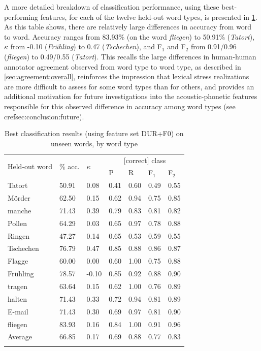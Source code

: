 	
	A more detailed breakdown of classification performance, using these best-performing features, for each of the twelve held-out word types, is presented in \cref{tab:results:wordtypes}. As this table shows, there are relatively large differences in accuracy from word to word. Accuracy ranges from 83.93\% (on the word \textit{fliegen}) to 50.91\% (\textit{Tatort}), $\kappa$ from -0.10 (\textit{Fr\"uhling}) to 0.47 (\textit{Tschechen}), and F$_1$ and F$_2$ from 0.91/0.96 (\textit{fliegen}) to 0.49/0.55 (\textit{Tatort}). This recalls the large differences in human-human annotator agreement observed from word type to word type, as described in \cref{sec:agreement:overall}, reinforces the impression that lexical stress realizations are more difficult to assess for some word types than for others, and provides an additional motivation for future investigations into the acoustic-phonetic features responsible for this observed difference in accuracy among word types (see cref{sec:conclusion:future}).
	
	
	
		\begin{table}
			\centering
			\caption[Best classification results on unseen words, by word type]{Best classification results (using feature set DUR+F0) on unseen words, by word type   }
			\begin{tabularx}{\textwidth}{lXXXXXX}			
			\toprule
			\multirow{2}{*}{Held-out word} & \multirow{2}{*}{\% acc.} & \multirow{2}{*}{$\kappa$} & \multicolumn{4}{c}{[correct] class} \\
			\cmidrule(lr){4-7}
			& & & P & R & F$_1$ & F$_2$ \\
			\midrule
Tatort	&	50.91	&	0.08	&	0.41	&	0.60	&	0.49	&	0.55	\\
M\"order	&	62.50	&	0.15	&	0.62	&	0.94	&	0.75	&	0.85	\\
manche	&	71.43	&	0.39	&	0.79	&	0.83	&	0.81	&	0.82	\\
Pollen	&	64.29	&	0.03	&	0.65	&	0.97	&	0.78	&	0.88	\\
Ringen	&	47.27	&	0.14	&	0.65	&	0.53	&	0.59	&	0.55	\\
Tschechen	&	76.79	&	0.47	&	0.85	&	0.88	&	0.86	&	0.87	\\
Flagge	&	60.00	&	0.00	&	0.60	&	1.00	&	0.75	&	0.88	\\
Fr\"uhling	&	78.57	&	-0.10	&	0.85	&	0.92	&	0.88	&	0.90	\\
tragen	&	63.64	&	0.15	&	0.62	&	1.00	&	0.76	&	0.89	\\
halten	&	71.43	&	0.33	&	0.72	&	0.94	&	0.81	&	0.89	\\
E-mail	&	71.43	&	0.30	&	0.69	&	0.97	&	0.81	&	0.90	\\
fliegen	&	83.93	&	0.16	&	0.84	&	1.00	&	0.91	&	0.96	\\
\addlinespace													
Average	&	66.85	&	0.17	&	0.69	&	0.88	&	0.77	&	0.83	\\
			\bottomrule
			\label{tab:results:wordtypes}
			\end{tabularx}
		\end{table}
	
